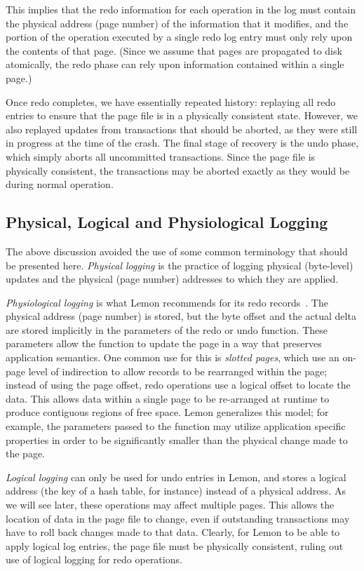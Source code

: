 \documentclass[letterpaper,twocolumn,english]{article}
\newcommand{\yad}{Lemon\xspace}
\begin{document}
This implies that the redo information for each operation in the log
must contain the physical address (page number) of the information
that it modifies, and the portion of the operation executed by a
single redo log entry must only rely upon the contents of that
page. (Since we assume that pages are propagated to disk atomically,
the redo phase can rely upon information contained within a single
page.)

Once redo completes, we have essentially repeated history: replaying
all redo entries to ensure that the page file is in a physically
consistent state.  However, we also replayed updates from transactions
that should be aborted, as they were still in progress at the time of
the crash.  The final stage of recovery is the undo phase, which simply
aborts all uncommitted transactions. Since the page file is physically
consistent, the transactions may be aborted exactly as they would be
during normal operation.


\subsection{Physical, Logical and Physiological Logging}

The above discussion avoided the use of some common terminology 
that should be presented here. {\em Physical logging } 
is the practice of logging physical (byte-level) updates
and the physical (page number) addresses to which they are applied.

{\em Physiological logging } is what \yad recommends for its redo
records~\cite{physiological}. The physical address (page number) is
stored, but the byte offset and the actual delta are stored implicitly
in the parameters of the redo or undo function. These parameters allow
the function to update the page in a way that preserves application
semantics.  One common use for this is {\em slotted pages}, which use
an on-page level of indirection to allow records to be rearranged
within the page; instead of using the page offset, redo operations use
a logical offset to locate the data. This allows data within a single
page to be re-arranged at runtime to produce contiguous regions of
free space. \yad generalizes this model; for example, the parameters
passed to the function may utilize application specific properties in
order to be significantly smaller than the physical change made to the
page.

{\em Logical logging } can only be used for undo entries in \yad, and
stores a logical address (the key of a hash table, for instance)
instead of a physical address. As we will see later, these operations
may affect multiple pages.  This allows the location of data in the
page file to change, even if outstanding transactions may have to roll
back changes made to that data. Clearly, for \yad to be able to apply
logical log entries, the page file must be physically consistent,
ruling out use of logical logging for redo operations.
\end{document}
